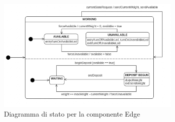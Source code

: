 \documentclass[a4paper, 12pt]{report}
\begin{document}
			\begin{figure}[H]
				\centering
				\includegraphics[width=0.8\textwidth]{"img/EdgeStatechart"}    
				\caption{Diagramma di stato per la componente Edge}
			\end{figure}
\end{document}
